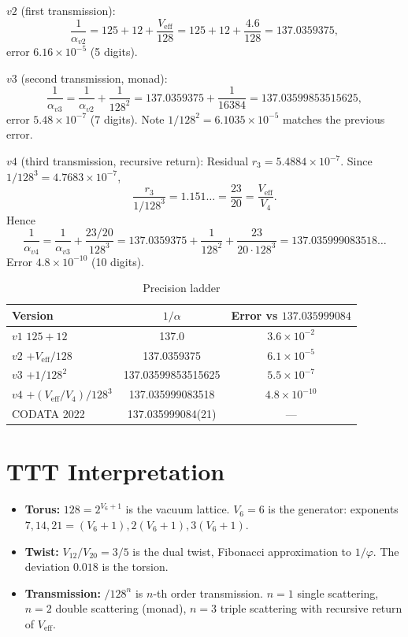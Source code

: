 \documentclass[12pt,a4paper]{article}
\begin{document}
$v2$ (first transmission):
\begin{equation}
\frac{1}{\alpha_{v2}} =125+12+\frac{V_{\text{eff}}}{128}=125+12+\frac{4.6}{128}=137.0359375,
\end{equation}
error $6.16\times10^{-5}$ (5 digits).

$v3$ (second transmission, monad):
\begin{equation}
\frac{1}{\alpha_{v3}} =\frac{1}{\alpha_{v2}}+\frac{1}{128^2}=137.0359375+\frac{1}{16384}=137.03599853515625,
\end{equation}
error $5.48\times10^{-7}$ (7 digits). Note $1/128^2=6.1035\times10^{-5}$ matches the previous error.

$v4$ (third transmission, recursive return):
Residual $r_3=5.4884\times10^{-7}$. Since $1/128^3=4.7683\times10^{-7}$,
\begin{equation}
\frac{r_3}{1/128^3}=1.151\ldots=\frac{23}{20}=\frac{V_{\text{eff}}}{V_4}.
\end{equation}
Hence
\begin{equation}
\frac{1}{\alpha_{v4}} =\frac{1}{\alpha_{v3}}+\frac{23/20}{128^3}=137.0359375+\frac{1}{128^2}+\frac{23}{20\cdot128^3}=137.035999083518\ldots
\end{equation}
Error $4.8\times10^{-10}$ (10 digits).

\begin{table}[h]
\centering
\caption{Precision ladder}
\begin{tabular}{@{}lcc@{}}
\toprule
Version & $1/\alpha$ & Error vs $137.035999084$ \\
\midrule
$v1$ $125+12$ & 137.0 & $3.6\times10^{-2}$ \\
$v2$ $+V_{\text{eff}}/128$ & 137.0359375 & $6.1\times10^{-5}$ \\
$v3$ $+1/128^2$ & 137.03599853515625 & $5.5\times10^{-7}$ \\
$v4$ $+ (V_{\text{eff}}/V_4)/128^3$ & 137.035999083518 & $4.8\times10^{-10}$ \\
CODATA 2022 & 137.035999084(21) & --- \\
\bottomrule
\end{tabular}
\end{table}

\section{TTT Interpretation}
\begin{itemize}
\item \textbf{Torus:} $128=2^{V_6+1}$ is the vacuum lattice. $V_6=6$ is the generator: exponents $7,14,21 = (V_6+1),2(V_6+1),3(V_6+1)$.
\item \textbf{Twist:} $V_{12}/V_{20}=3/5$ is the dual twist, Fibonacci approximation to $1/\varphi$. The deviation $0.018$ is the torsion.
\item \textbf{Transmission:} $/128^n$ is $n$-th order transmission. $n=1$ single scattering, $n=2$ double scattering (monad), $n=3$ triple scattering with recursive return of $V_{\text{eff}}$.
\end{itemize}
\end{document}
